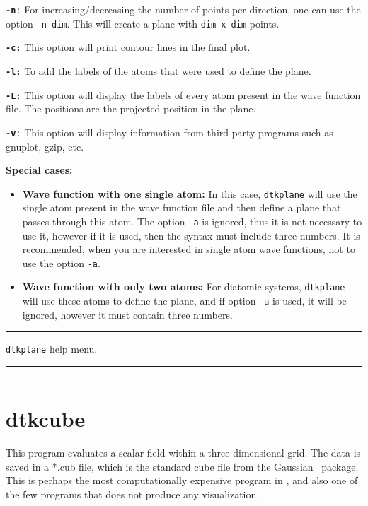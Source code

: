 \texttt{\textbf{-n}:} For increasing/decreasing the number of points per direction, one can use the option \texttt{-n dim}. This will create a plane with \texttt{dim x dim} points.

\texttt{\textbf{-c:}} This option will print contour lines in the final plot.

\texttt{\textbf{-l:}} To add the labels of the atoms that were used to define the plane.

\texttt{\textbf{-L:}} This option will display the labels of every atom present in the wave function file. The positions are the projected position in the plane.

\texttt{\textbf{-v}:} This option will display information from third party programs such as gnuplot, gzip, etc.

\textbf{Special cases:}
\begin{itemize}
   \item \textbf{Wave function with one single atom:} In this case, \texttt{dtkplane} will use the single atom present in the wave function file and then define a plane that passes through this atom. The option \texttt{-a} is ignored, thus it is not necessary to use it, however if it is used, then the syntax must include three numbers. It is recommended, when you are interested in single atom wave functions, not to use the option \texttt{-a}.
   \item \textbf{Wave function with only two atoms:} For diatomic systems, \texttt{dtkplane} will use these atoms to define the plane, and if option \texttt{-a} is used, it will be ignored, however it must contain three numbers.
\end{itemize}

\rule{\textwidth}{1pt}
{\center\texttt{dtkplane} help menu.\\}
\rule{\textwidth}{1pt}
\begin{footnotesize}
\end{footnotesize}
\rule{\textwidth}{1pt}
\section{dtkcube}\label{sec:dtkcube}

This program evaluates a scalar field within a three dimensional grid. The data is saved in a *.cub file, which is the standard cube file from the Gaussian~\cite{bib:gaussian09} package. This is perhaps the most computationally expensive program in \DTK{}, and also one of the few programs that does not produce any visualization.


